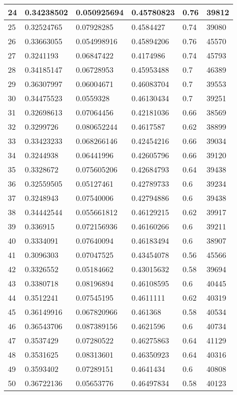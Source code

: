 \begin{longtable}{|l|l|l|l|l|l|}
24 & 0.34238502 & 0.050925694 & 0.45780823 & 0.76 & 39812 \\ \hline 
25 & 0.32524765 & 0.07928285 & 0.4584427 & 0.74 & 39080 \\ \hline 
26 & 0.33663055 & 0.054998916 & 0.45894206 & 0.76 & 45570 \\ \hline 
27 & 0.3241193 & 0.06847422 & 0.4174986 & 0.74 & 45793 \\ \hline 
28 & 0.34185147 & 0.06728953 & 0.45953488 & 0.7 & 46389 \\ \hline 
29 & 0.36307997 & 0.06004671 & 0.46083704 & 0.7 & 39553 \\ \hline 
30 & 0.34475523 & 0.0559328 & 0.46130434 & 0.7 & 39251 \\ \hline 
31 & 0.32698613 & 0.07064456 & 0.42181036 & 0.66 & 38569 \\ \hline 
32 & 0.3299726 & 0.080652244 & 0.4617587 & 0.62 & 38899 \\ \hline 
33 & 0.33423233 & 0.068266146 & 0.42454216 & 0.66 & 39034 \\ \hline 
34 & 0.3244938 & 0.06441996 & 0.42605796 & 0.66 & 39120 \\ \hline 
35 & 0.3328672 & 0.075605206 & 0.42684793 & 0.64 & 39438 \\ \hline 
36 & 0.32559505 & 0.05127461 & 0.42789733 & 0.6 & 39234 \\ \hline 
37 & 0.3248943 & 0.07540006 & 0.42794886 & 0.6 & 39438 \\ \hline 
38 & 0.34442544 & 0.055661812 & 0.46129215 & 0.62 & 39917 \\ \hline 
39 & 0.336915 & 0.072156936 & 0.46160266 & 0.6 & 39211 \\ \hline 
40 & 0.3334091 & 0.07640094 & 0.46183494 & 0.6 & 38907 \\ \hline 
41 & 0.3096303 & 0.07047525 & 0.43454078 & 0.56 & 45566 \\ \hline 
42 & 0.3326552 & 0.05184662 & 0.43015632 & 0.58 & 39694 \\ \hline 
43 & 0.3380718 & 0.08196894 & 0.46108595 & 0.6 & 40445 \\ \hline 
44 & 0.3512241 & 0.07545195 & 0.4611111 & 0.62 & 40319 \\ \hline 
45 & 0.36149916 & 0.067820966 & 0.461368 & 0.58 & 40534 \\ \hline 
46 & 0.36543706 & 0.087389156 & 0.4621596 & 0.6 & 40734 \\ \hline 
47 & 0.3537429 & 0.07280522 & 0.46275863 & 0.64 & 41129 \\ \hline 
48 & 0.3531625 & 0.08313601 & 0.46350923 & 0.64 & 40316 \\ \hline 
49 & 0.3593402 & 0.07289151 & 0.4641434 & 0.6 & 40808 \\ \hline 
50 & 0.36722136 & 0.05653776 & 0.46497834 & 0.58 & 40123 \\ \hline 
\end{longtable}